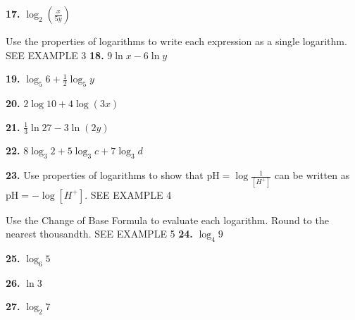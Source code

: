 \documentclass{article}
\newenvironment{practice}[2]{\textbf{#1.}}{}
\newcommand{\answer}[1]{}
\begin{document}
\begin{practice}{17}{}
$\log_2\left(\frac{x}{5y}\right)$
\answer{$\log_2 x - \log_2 5 - \log_2 y$}
\end{practice}

Use the properties of logarithms to write each expression as a single logarithm. SEE EXAMPLE 3
\begin{practice}{18}{}
$9\ln x - 6\ln y$
\answer{$\ln\left(\frac{x^9}{y^6}\right)$}
\end{practice}

\begin{practice}{19}{}
$\log_5 6 + \frac{1}{2}\log_5 y$
\answer{$\log_5(6\sqrt{y})$}
\end{practice}

\begin{practice}{20}{}
$2\log 10 + 4\log(3x)$
\answer{$\log(8100x^4)$}
\end{practice}

\begin{practice}{21}{}
$\frac{1}{3}\ln 27 - 3\ln(2y)$
\answer{$\ln\left(\frac{3}{8y^3}\right)$}
\end{practice}

\begin{practice}{22}{}
$8\log_3 2 + 5\log_3 c + 7\log_3 d$
\answer{$\log_3(256c^5 d^7)$}
\end{practice}

\begin{practice}{23}{}
Use properties of logarithms to show that $\text{pH} = \log\frac{1}{[H^+]}$ can be written as $\text{pH} = -\log[H^+]$. SEE EXAMPLE 4
\answer{$\log\left(\frac{1}{[H^+]}\right) = \log 1 - \log[H^+] = 0 - \log[H^+] = -\log[H^+]$.}
\end{practice}

Use the Change of Base Formula to evaluate each logarithm. Round to the nearest thousandth. SEE EXAMPLE 5
\begin{practice}{24}{}
$\log_4 9$
\answer{$1.585$}
\end{practice}

\begin{practice}{25}{}
$\log_6 5$
\answer{$0.898$}
\end{practice}

\begin{practice}{26}{}
$\ln 3$
\answer{$1.099$}
\end{practice}

\begin{practice}{27}{}
$\log_2 7$
\answer{$2.807$}
\end{practice}
\end{document}

